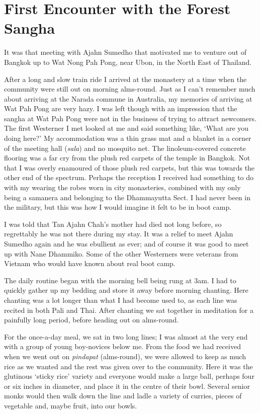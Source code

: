 \chapter{First Encounter with the Forest Sangha}

It was that meeting with Ajahn Sumedho that motivated me to venture out
of Bangkok up to Wat Nong Pah Pong, near Ubon, in the North East of
Thailand.

After a long and slow train ride I arrived at the monastery at a time
when the community were still out on morning alms-round. Just as I can't
remember much about arriving at the Narada commune in Australia, my
memories of arriving at Wat Pah Pong are very hazy. I was left though
with an impression that the sangha at Wat Pah Pong were not in the
business of trying to attract newcomers. The first Westerner I met
looked at me and said something like, `What are you doing here?' My
accommodation was a thin grass mat and a blanket in a corner of the
meeting hall (\emph{sala}) and no mosquito net. The linoleum-covered
concrete flooring was a far cry from the plush red carpets of the temple
in Bangkok. Not that I was overly enamoured of those plush red carpets,
but this was towards the other end of the spectrum. Perhaps the
reception I received had something to do with my wearing the robes worn
in city monasteries, combined with my only being a samanera and
belonging to the Dhammayutta Sect. I had never been in the military, but
this was how I would imagine it felt to be in boot camp.

I was told that Tan Ajahn Chah's mother had died not long before, so
regrettably he was not there during my stay. It was a relief to meet
Ajahn Sumedho again and he was ebullient as ever; and of course it was
good to meet up with Nane Dhammiko. Some of the other Westerners were
veterans from Vietnam who would have known about real boot camp.

The daily routine began with the morning bell being rung at 3am. I had
to quickly gather up my bedding and store it away before morning
chanting. Here chanting was a lot longer than what I had become used to,
as each line was recited in both Pali and Thai. After chanting we sat
together in meditation for a painfully long period, before heading out
on alms-round.

For the once-a-day meal, we sat in two long lines; I was almost at the
very end with a group of young boy-novices below me. From the food we
had received when we went out on \emph{pindapat} (alms-round), we were
allowed to keep as much rice as we wanted and the rest was given over to
the community. Here it was the glutinous `sticky rice' variety and
everyone would make a large ball, perhaps four or six inches in
diameter, and place it in the centre of their bowl. Several senior monks
would then walk down the line and ladle a variety of curries, pieces of
vegetable and, maybe fruit, into our bowls.

